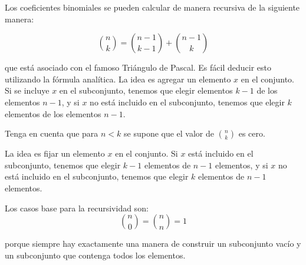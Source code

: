 Los coeficientes binomiales se pueden calcular de manera recursiva de la siguiente manera:

$$\binom n k = \binom {n-1} {k-1} + \binom {n-1} k$$

que está asociado con el famoso Triángulo de Pascal. Es fácil deducir esto utilizando la fórmula analítica. La idea es agregar un elemento $x$ en el conjunto. Si se incluye $x$ en el subconjunto, tenemos que elegir elementos $k-1$ de los elementos $n-1$, y si $x$ no está incluido en el subconjunto, tenemos que elegir $k$ elementos de los elementos $n-1$.

Tenga en cuenta que para $n < k$ se supone que el valor de $\binom n k$ es cero.

La idea es fijar un elemento $x$ en el conjunto. Si $x$ está incluido en el subconjunto, tenemos que elegir $k-1$ elementos de $n-1$ elementos, y si $x$ no está incluido en el subconjunto, tenemos que elegir $k$ elementos de $n-1$ elementos.

Los casos base para la recursividad son:
$$\binom n 0 = \binom n n = 1$$

porque siempre hay exactamente una manera de construir un subconjunto vacío y un subconjunto que contenga todos los elementos.

